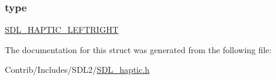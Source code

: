 \subsubsection[{\texorpdfstring{type}{type}}]{ type}\hypertarget{struct_s_d_l___haptic_left_right_a8db4a3e9f29940892f2773bca31c74e1}{}\label{struct_s_d_l___haptic_left_right_a8db4a3e9f29940892f2773bca31c74e1}
\hyperlink{_s_d_l__haptic_8h_ae047624d8458ff6400887c37a36f86d3}{S\+D\+L\+\_\+\+H\+A\+P\+T\+I\+C\+\_\+\+L\+E\+F\+T\+R\+I\+G\+HT} 

The documentation for this struct was generated from the following file\+:\begin{DoxyCompactItemize}
\item 
Contrib/\+Includes/\+S\+D\+L2/\hyperlink{_s_d_l__haptic_8h}{S\+D\+L\+\_\+haptic.\+h}\end{DoxyCompactItemize}
